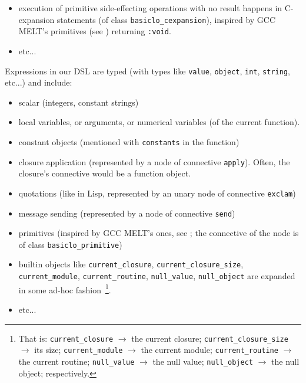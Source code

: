 \begin{itemize}
      \item execution of primitive side-effecting operations with no
        result happens in C-expansion statements (of class
          \texttt{basiclo\_cexpansion}), inspired by GCC MELT's
          primitives (see \cite{Starynkevitch-DSL2011}) returning
          \texttt{:void}.

      \item etc...
\end{itemize}

Expressions in our DSL are typed (with types like \texttt{value},
\texttt{object}, \texttt{int}, \texttt{string}, etc...)  and include:

\begin{itemize}
\item scalar (integers, constant strings)
  
\item local variables, or arguments, or numerical variables (of the current function).

\item constant objects (mentioned with \texttt{constants} in the function)

\item closure application (represented by a node of connective \texttt{apply}). Often, the closure's connective would be a
  function object.

  \item quotations (like in Lisp, represented by an unary node of
    connective \texttt{exclam})

\item message sending (represented by a node of connective \texttt{send})

\item primitives (inspired by GCC MELT's ones, see
  \cite{Starynkevitch-DSL2011}; the connective of the node is of class
  \texttt{basiclo\_primitive})

  \item builtin objects like \texttt{current\_closure},
    \texttt{current\_closure\_size}, \texttt{current\_module},
    \texttt{current\_routine}, \texttt{null\_value},
    \texttt{null\_object} are expanded in some ad-hoc    
    fashion~\footnote{That is:
      \texttt{current\_closure} $\rightarrow$ the current closure;
      \texttt{current\_closure\_size} $\rightarrow$ its size;
      \texttt{current\_module} $\rightarrow$ the current module;
      \texttt{current\_routine} $\rightarrow$ the current routine;
      \texttt{null\_value} $\rightarrow$ the null value;
      \texttt{null\_object} $\rightarrow$ the null object;
      respectively.}.

\item etc...
  
\end{itemize}
  

